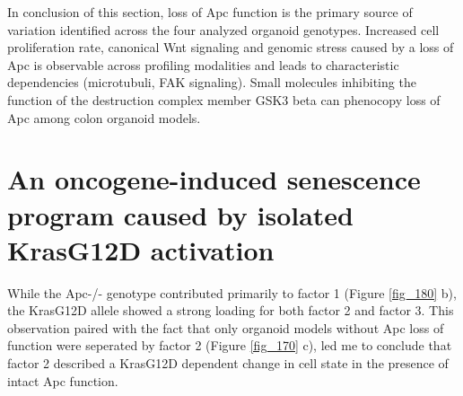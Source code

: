 \begin{flushleft}
\smallbreak
In conclusion of this section, loss of Apc function is the primary source of variation identified across the four analyzed organoid genotypes. Increased cell proliferation rate, canonical Wnt signaling and genomic stress caused by a loss of Apc is observable across profiling modalities and leads to characteristic dependencies (microtubuli, FAK signaling). Small molecules inhibiting the function of the destruction complex member GSK3 beta can phenocopy loss of Apc among colon organoid models.   

\newpage

\section{An oncogene-induced senescence program caused by isolated KrasG12D activation}
While the Apc-/- genotype contributed primarily to factor 1 (Figure \ref{fig_180} b), the KrasG12D allele showed a strong loading for both factor 2 and factor 3. This observation paired with the fact that only organoid models without Apc loss of function were seperated by factor 2 (Figure \ref{fig_170} c), led me to conclude that factor 2 described a KrasG12D dependent change in cell state in the presence of intact Apc function.



\end{flushleft}
